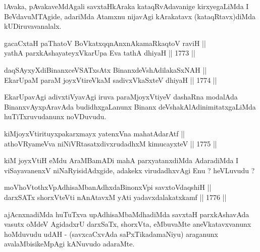 \begin{artha}
lAvaka, pAvakaveMdAgali savxtaHkAraka kataqRvAdavanige kirxyegaLiMda
I BeVdavuMTAgide, adariMda Atamxnu nijavAgi kArakatavx
(kataqRtavx)diMda kUDiruvavanalalx.
\end{artha}

\begin{shl}
gacaCxtaH paThatoV BoVkatxqqnAnxnAkamaRkaqtoV raviH || \\
yathA parxkAshayateyxVkarUpa Eva tathA dhiyaH \hfill || 1773 ||  
\end{shl}




\begin{shl}
daqSAyxyXdiBinanxceVSATxsAtx BinanxdeVshAdilakaSxNAH || \\
EkarUpaM paraM joyxVtireVkaM sadivxVkaSxteV dhiyaH \hfill || 1774 ||  
\end{shl}

\begin{artha}
EkarUpavAgi adivxtiVyavAgi iruva paraMjoyxVtiyeV dashaRna modalAda
BinanxvAyxpAravAda budidhxgaLanunx Binanx deVshakAlAdinimitatxgaLiMda
huTiTxruvudanunx noVDuvudu.
\end{artha}

\begin{shl}
kiMjoyxVtirituyxpakarxmayx yatenxVna mahatA\s \s darAtf ||  \\
athoVR\s yameVva niNiVRtasatxdivxrudadhxM kimucayxteV \hfill || 1775 ||  
\end{shl}

\begin{artha}
kiM joyxVtiH eMdu AraMBamADi mahA parxyatanxdiMda AdaradiMda I
viSayavanenxV niNaRyisidAdxgide, adakekx virudadhxvAgi Enu ? heVLuvudu ?
\end{artha}


\begin{shl}
moVhoVtothxVpAdhisaMbanAdhxdaBinonxV\s pi savxtoVdaqshiH || \\
darxSATx shorxVteVti nAnAtavxM yAti yadavxdalakatxkamf \hfill || 1776 ||  
\end{shl}

\begin{artha}
ajAcnxnadiMda huTuTxva upAdhisaMbaMdhadiMda savxtaH parxkAshavAda
vasutx oMdeV AgidadxrU darxSaTx, shorxVta, eMbuvaMte aneVkatavxvanunx
hoMduvudu udAH - (savxcaCxvAda saPxTikadamaNiyu) araganunx
avalaMbisikeMpAgi kANuvudo adaraMte.
\end{artha}

